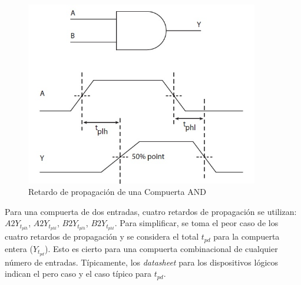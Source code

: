 \documentclass[12pt]{book}
\theoremstyle{definition}
\theoremstyle{remark}
\theoremstyle{plain}
\begin{document}
\begin{figure}
\centering
\includegraphics[width=4in]{Anddelay.jpg}
\caption{Retardo de propagación de una Compuerta AND}
\label{fig12}
\end{figure}


Para una compuerta de dos entradas, cuatro retardos de propagación se utilizan: $A2Y_{t_{plh}}$, $A2Y_{t_{phl}}$, $B2Y_{t_{plh}}$, $B2Y_{t_{phl}}$. Para simplificar, se toma el peor caso de los cuatro retardos de propagación y se considera el total $t_{pd}$ para la compuerta entera ($Y_{t_{pd}}$). Esto es cierto para una compuerta combinacional de cualquier número de entradas.  Típicamente, los \emph{datasheet} para los dispositivos lógicos indican el pero caso y el caso típico para $t_{pd}$.



\backmatter
\end{document}
